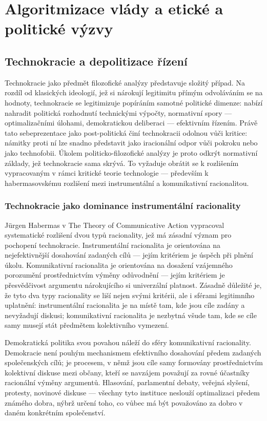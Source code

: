 \chapter{Algoritmizace vlády a etické a politické výzvy}
\section{Technokracie a depolitizace řízení}
Technokracie jako předmět filozofické analýzy představuje složitý případ. Na rozdíl od klasických ideologií, jež si nárokují legitimitu přímým odvoláváním se na hodnoty, technokracie se legitimizuje popíráním samotné politické dimenze: nabízí nahradit politická rozhodnutí technickými výpočty, normativní spory — optimalizačními úlohami, demokratickou deliberaci — efektivním řízením. Právě tato sebeprezentace jako post-politická činí technokracii odolnou vůči kritice: námitky proti ní lze snadno představit jako iracionální odpor vůči pokroku nebo jako technofobii. Úkolem politicko-filozofické analýzy je proto odkrýt normativní základy, jež technokracie sama skrývá. To vyžaduje obrátit se k rozlišením vypracovaným v rámci kritické teorie technologie — především k habermasovskému rozlišení mezi instrumentální a komunikativní racionalitou.

\subsection{Technokracie jako dominance instrumentální racionality}
Jürgen Habermas v The Theory of Communicative Action \parencite{Habermas84} vypracoval systematické rozlišení dvou typů racionality, jež má zásadní význam pro pochopení technokracie. Instrumentální racionalita je orientována na nejefektivnější dosahování zadaných cílů — jejím kritériem je úspěch při plnění úkolu. Komunikativní racionalita je orientována na dosažení vzájemného porozumění prostřednictvím výměny odůvodnění — jejím kritériem je přesvědčivost argumentu nárokujícího si univerzální platnost. Zásadně důležité je, že tyto dva typy racionality se liší nejen svými kritérii, ale i sférami legitimního uplatnění: instrumentální racionalita je na místě tam, kde jsou cíle zadány a nevyžadují diskusi; komunikativní racionalita je nezbytná všude tam, kde se cíle samy musejí stát předmětem kolektivního vymezení.

Demokratická politika svou povahou náleží do sféry komunikativní racionality. Demokracie není pouhým mechanismem efektivního dosahování předem zadaných společenských cílů; je procesem, v němž jsou cíle samy formovány prostřednictvím kolektivní diskuse mezi občany, kteří se navzájem považují za rovné účastníky racionální výměny argumentů. Hlasování, parlamentní debaty, veřejná slyšení, protesty, novinové diskuse — všechny tyto instituce neslouží optimalizaci předem známého dobra, nýbrž určení toho, co vůbec má být považováno za dobro v daném konkrétním společenství.

